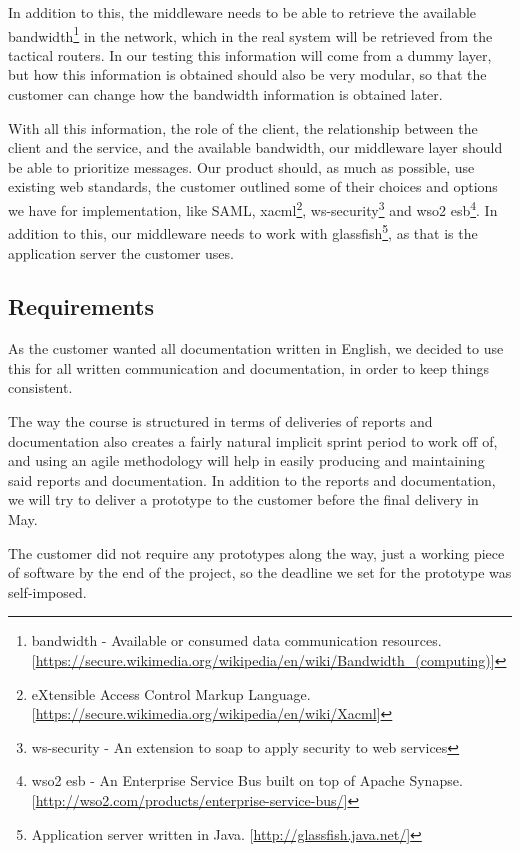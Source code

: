     In addition to this, the middleware needs to be able to retrieve the available \gls{bandwidth}\footnote{\Gls{bandwidth} - Available or consumed data communication resources.[\url{https://secure.wikimedia.org/wikipedia/en/wiki/Bandwidth_(computing)}]} in the network, which in the real system will be retrieved from the tactical routers. In our testing this information will come from a dummy layer, but how this information is obtained should also be very modular, so that the customer can change how the bandwidth information is obtained later.

    With all this information, the role of the client, the relationship between the client and the service, and the available bandwidth, our middleware layer should be able to prioritize messages. Our product should, as much as possible, use existing web standards, the customer outlined some of their choices and options we have for implementation, like SAML, \gls{xacml}\footnote{eXtensible Access Control Markup Language. [\url{https://secure.wikimedia.org/wikipedia/en/wiki/Xacml}]}, \gls{ws-security}\footnote{\gls{ws-security} - An extension to \gls{soap} to apply security to web services} and \gls{wso2 esb}\footnote{\gls{wso2 esb} - An Enterprise Service Bus built on top of Apache Synapse. [\url{http://wso2.com/products/enterprise-service-bus/}]}. In addition to this, our middleware needs to work with \gls{glassfish}\footnote{Application server written in Java. [\url{http://glassfish.java.net/}]}, as that is the application server the customer uses.
   
    \subsection{Requirements}\label{Requirements}
    As the customer wanted all documentation written in English, we decided to use this for all written communication and documentation, in order to keep things consistent.
    
    The way the course is structured in terms of deliveries of reports and documentation also creates a fairly natural implicit sprint period to work off of, and using an agile methodology will help in easily producing and maintaining said reports and documentation. In addition to the  reports and documentation, we will try to deliver a prototype to the customer before the final delivery in May.

    The customer did not require any prototypes along the way, just a working piece of software by the end of the project, so the deadline we set for the prototype was self-imposed. 

